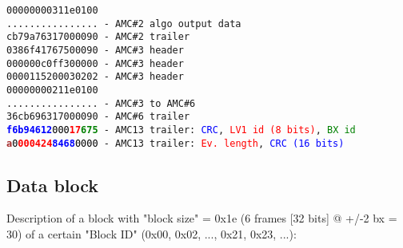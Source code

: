 \texttt{00000000311e0100}\\
\texttt{................ - AMC\#2 algo output data}\\
\texttt{cb79a76317000090 - AMC\#2 trailer}\\
\texttt{0386f41767500090 - AMC\#3 header}\\
\texttt{000000c0ff300000 - AMC\#3 header}\\
\texttt{0000115200030202 - AMC\#3 header}\\
\texttt{00000000211e0100}\\
\texttt{................ - AMC\#3 to AMC\#6}\\
\texttt{36cb696317000090 - AMC\#6 trailer}\\
\texttt{\textcolor{blue}{\textbf{f6b94612}}\textcolor{black}{000}\textcolor{red}{\textbf{17}}\textcolor{green}{\textbf{675}} - AMC13 trailer: \textcolor{blue}{CRC}, \textcolor{red}{LV1 id (8 bits)}, \textcolor{green}{BX id}}\\
\texttt{\textcolor{brown}{\textbf{a}}\textcolor{black}{0}\textcolor{red}{\textbf{000424}}\textcolor{blue}{\textbf{8468}}\textcolor{black}{0000} - AMC13 trailer: \textcolor{red}{Ev. length}, \textcolor{blue}{CRC (16 bits)}}\\

\clearpage

\subsection{Data block}
\label{sec:data_block}
Description of a block with "block size" = 0x1e (6 frames [32 bits] @ +/-2 bx = 30) of a certain "Block ID" (0x00, 0x02, ..., 0x21, 0x23, ...):


